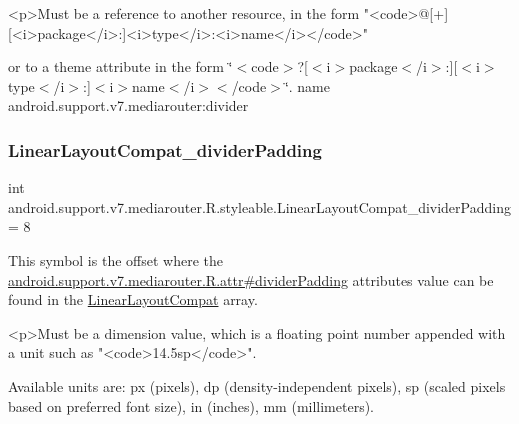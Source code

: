 \begin{DoxyVerb}      <p>Must be a reference to another resource, in the form "<code>@[+][<i>package</i>:]<i>type</i>:<i>name</i></code>"
\end{DoxyVerb}
 or to a theme attribute in the form \char`\"{}$<$code$>$?\mbox{[}$<$i$>$package$<$/i$>$\+:\mbox{]}\mbox{[}$<$i$>$type$<$/i$>$\+:\mbox{]}$<$i$>$name$<$/i$>$$<$/code$>$\char`\"{}.  name android.\+support.\+v7.\+mediarouter\+:divider \mbox{\label{classandroid_1_1support_1_1v7_1_1mediarouter_1_1R_1_1styleable_a6f1edd962e5544040cdb17a48e26029a}} 
\subsubsection{\texorpdfstring{Linear\+Layout\+Compat\+\_\+divider\+Padding}{LinearLayoutCompat\_dividerPadding}}
{\footnotesize\ttfamily int android.\+support.\+v7.\+mediarouter.\+R.\+styleable.\+Linear\+Layout\+Compat\+\_\+divider\+Padding = 8\hspace{0.3cm}{\ttfamily [static]}}

This symbol is the offset where the \hyperlink{classandroid_1_1support_1_1v7_1_1mediarouter_1_1R_1_1attr_a1211ba7f3739936f900811426f3f70d9}{android.\+support.\+v7.\+mediarouter.\+R.\+attr\#divider\+Padding} attribute\textquotesingle{}s value can be found in the \hyperlink{classandroid_1_1support_1_1v7_1_1mediarouter_1_1R_1_1styleable_a47eee9f8c488407b3ea7145bb65c01b9}{Linear\+Layout\+Compat} array.

\begin{DoxyVerb}      <p>Must be a dimension value, which is a floating point number appended with a unit such as "<code>14.5sp</code>".
\end{DoxyVerb}
 Available units are\+: px (pixels), dp (density-\/independent pixels), sp (scaled pixels based on preferred font size), in (inches), mm (millimeters). 

